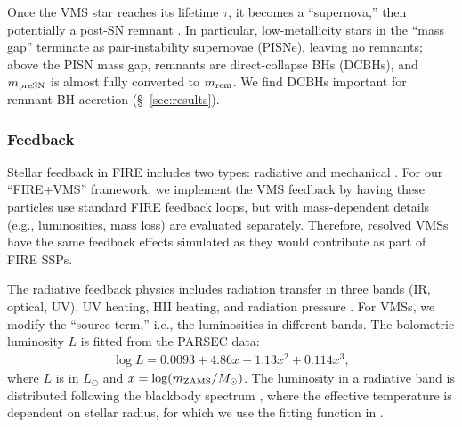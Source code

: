 \documentclass[twocolumn]{aastex631}
\begin{document}
Once the VMS star reaches its lifetime $\tau$, it becomes a ``supernova,'' then potentially a post-SN remnant \citep[depending on $m_{\rm ZAMS}$ and $Z$;][]{CostaShepherdBressan_2025A&A...694A.193C}. In particular, low-metallicity stars in the ``mass gap'' terminate as pair-instability supernovae (PISNe), leaving no remnants; above the PISN mass gap, remnants are direct-collapse BHs (DCBHs), and $m_{\rm preSN}$ is almost fully converted to $m_{\rm rem}$. We find DCBHs important for remnant BH accretion (\S~\ref{sec:results}).

\subsubsection{Feedback}

Stellar feedback in FIRE includes two types: radiative and mechanical \citep{HopkinsWetzelKeres_2018MNRAS.480..800H,HopkinsWetzelWheeler_2023MNRAS.519.3154H}. For our ``FIRE+VMS'' framework, we implement the VMS feedback by having these particles use standard FIRE feedback loops, but with mass-dependent details (e.g., luminosities, mass loss) are evaluated separately. Therefore, resolved VMSs have the same feedback effects simulated as they would contribute as part of FIRE SSPs.

The radiative feedback physics includes radiation transfer in three bands (IR, optical, UV), UV heating, HII heating, and radiation pressure \citep{HopkinsWetzelWheeler_2023MNRAS.519.3154H}. For VMSs, we modify the ``source term,'' i.e., the luminosities in different bands. The bolometric luminosity $L$ is fitted from the PARSEC data:
\begin{align}
    \log L = 0.0093 + 4.86 x - 1.13 x^2 + 0.114 x^3,
\end{align}
where $L$ is in $L_\odot$ and $x = \log(m_{\rm ZAMS}/{M_\odot})$. The luminosity in a radiative band is distributed following the blackbody spectrum \citep[][]{GrudicGuszejnovHopkins_2021MNRAS.506.2199G}, where the effective temperature is dependent on stellar radius, for which we use the fitting function in \citet{ToutPolsEggleton_1996MNRAS.281..257T}.
\end{document}
